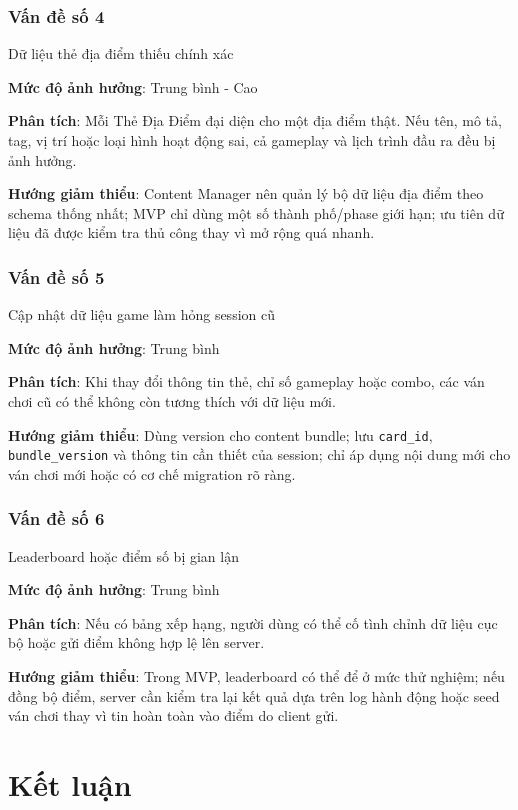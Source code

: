 \subsubsection{Vấn đề số 4}

\noindent Dữ liệu thẻ địa điểm thiếu chính xác

\textbf{Mức độ ảnh hưởng}: Trung bình - Cao

\textbf{Phân tích}: Mỗi Thẻ Địa Điểm đại diện cho một địa điểm thật. Nếu tên, mô tả, tag, vị trí hoặc loại hình hoạt động sai, cả gameplay và lịch trình đầu ra đều bị ảnh hưởng.

\textbf{Hướng giảm thiểu}: Content Manager nên quản lý bộ dữ liệu địa điểm theo schema thống nhất; MVP chỉ dùng một số thành phố/phase giới hạn; ưu tiên dữ liệu đã được kiểm tra thủ công thay vì mở rộng quá nhanh.

\subsubsection{Vấn đề số 5}

\noindent Cập nhật dữ liệu game làm hỏng session cũ

\textbf{Mức độ ảnh hưởng}: Trung bình

\textbf{Phân tích}: Khi thay đổi thông tin thẻ, chỉ số gameplay hoặc combo, các ván chơi cũ có thể không còn tương thích với dữ liệu mới.

\textbf{Hướng giảm thiểu}: Dùng version cho content bundle; lưu \texttt{card\_id}, \texttt{bundle\_version} và thông tin cần thiết của session; chỉ áp dụng nội dung mới cho ván chơi mới hoặc có cơ chế migration rõ ràng.

\subsubsection{Vấn đề số 6}

\noindent Leaderboard hoặc điểm số bị gian lận

\textbf{Mức độ ảnh hưởng}: Trung bình

\textbf{Phân tích}: Nếu có bảng xếp hạng, người dùng có thể cố tình chỉnh dữ liệu cục bộ hoặc gửi điểm không hợp lệ lên server.

\textbf{Hướng giảm thiểu}: Trong MVP, leaderboard có thể để ở mức thử nghiệm; nếu đồng bộ điểm, server cần kiểm tra lại kết quả dựa trên log hành động hoặc seed ván chơi thay vì tin hoàn toàn vào điểm do client gửi.

\section{Kết luận}

